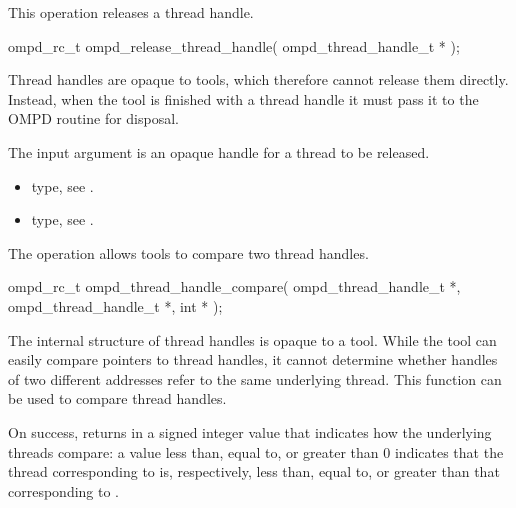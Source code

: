 \label{subsubsubsec:ompd_release_thread_handle}
\summary
This operation releases a thread handle.

\format

\begin{cspecific}
\begin{ompSyntax}
ompd_rc_t ompd_release_thread_handle(
  ompd_thread_handle_t *
);
\end{ompSyntax}
\end{cspecific}


\descr
Thread handles are opaque to tools, which therefore cannot release them directly.
Instead, when the tool is finished with a thread handle it must pass it to the OMPD
 routine for disposal.

\argdesc
The input argument  is an opaque handle for a thread
to be released.

\crossreferences
\begin{itemize}
  \item {} type, see .
	\item {} type, see .
\end{itemize}


\label{subsubsubsec:ompd_thread_handle_compare}
\summary
The  operation allows tools to compare
two thread handles.

\format

\begin{cspecific}
\begin{ompSyntax}
ompd_rc_t ompd_thread_handle_compare(
  ompd_thread_handle_t *,
  ompd_thread_handle_t *,
  int *
);
\end{ompSyntax}
\end{cspecific}


\descr
The internal structure of thread handles is opaque to a tool. While the tool can easily compare
pointers to thread handles, it cannot determine whether handles of two different addresses
refer to the same underlying thread. This function can be used to compare thread handles.

On success,  returns in  a signed
integer value that indicates how the underlying threads compare: a value less than, equal to, or
greater than 0 indicates that the thread corresponding to  is, respectively,
less than, equal to, or greater than that corresponding to .


